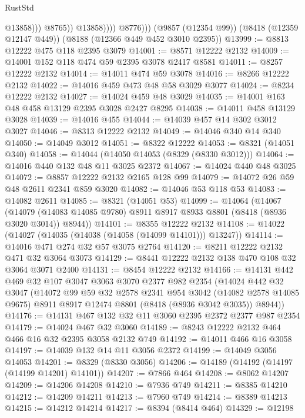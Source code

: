 \begin{lexlean}{RustStd}
\begin{coremodule}
                            @13858)))
                      @8765))
                  @13858))))
          @8776)))
    (@9857 (@12354 @99))
    (@8418 (@12359 @12147 @449))
    (@8188 (@12366 @449 @452 @3010 @2395))
@13999 := @8813 @12222 @475 @118 @2395 @3079
@14001 := @8571 @12222 @2132
@14009 := @14001 @152 @118 @474 @59 @2395 @3078 @2417 @8581
@14011 := @8257 @12222 @2132
@14014 := @14011 @474 @59 @3078
@14016 := @8266 @12222 @2132
@14022 := @14016 @459 @473 @48 @58 @3029 @3077
@14024 := @8234 @12222 @2132
@14027 := @14024 @459 @48 @3029
@14035 := @14001 @163 @48 @458 @13129 @2395 @3028 @2427 @8295
@14038 := @14011 @458 @13129 @3028
@14039 := @14016 @455
@14044 := @14039 @457 @14 @302 @3012 @3027
@14046 := @8313 @12222 @2132
@14049 := @14046 @340 @14 @340
@14050 := @14049 @3012
@14051 := @8322 @12222
@14053 := @8321 (@14051 @340)
@14058 := @14044 (@14050 @14053 (@8329 (@8330 @3012)))
@14064 := @14016 @440 @132 @48 @11 @3025 @2372
@14067 := @14024 @440 @48 @3025
@14072 := @8857 @12222 @2132 @2165 @128 @99
@14079 := @14072 @26 @59 @48 @2611 @2341 @859 @3020
@14082 := @14046 @53 @118 @53
@14083 := @14082 @2611
@14085 := @8321 (@14051 @53)
@14099 := @14064
    (@14067
      (@14079 (@14083 @14085 @9780) @8911 @8917 @8933 @8801 (@8418 (@8936 @3020 @3014)) @8944))
@14101 := @8355 @12222 @2132
@14108 := @14022 (@14027 (@14035 (@14038 (@14058 (@14099 @14101))) @13247))
@14114 := @14016 @471 @274 @32 @57 @3075 @2764
@14120 := @8211 @12222 @2132 @471 @32 @3064 @3073
@14129 := @8441 @12222 @2132 @138 @470 @108 @32 @3064 @3071 @2400
@14131 := @8454 @12222 @2132
@14166 := @14131
    @442
    @469
    @32
    @107
    @3047
    @3063
    @3070
    @2377
    @982
    @2354
    (@14024
      @442
      @32
      @3047
      (@14072
        @99
        @59
        @32
        @2578
        @2341
        @954
        @3042
        (@14082 @2578 @14085 @9675)
        @8911
        @8917
        @12474
        @8801
        (@8418 (@8936 @3042 @3035))
        @8944))
@14176 := @14131 @467 @132 @32 @11 @3060 @2395 @2372 @2377 @987 @2354
@14179 := @14024 @467 @32 @3060
@14189 := @8243 @12222 @2132 @464 @466 @16 @32 @2395 @3058 @2132 @749
@14192 := @14011 @466 @16 @3058
@14197 := @14039 @132 @14 @11 @3056 @2372
@14199 := @14049 @3056 @14053
@14201 := @8329 (@8330 @3056)
@14206 := @14189 (@14192 (@14197 (@14199 @14201) @14101))
@14207 := @7866 @464
@14208 := @8062 @14207
@14209 := @14206 @14208
@14210 := @7936 @749
@14211 := @8385 @14210
@14212 := @14209 @14211
@14213 := @7960 @749
@14214 := @8389 @14213
@14215 := @14212 @14214
@14217 := @8394 (@8414 @464)
@14329 := @12198

\end{coremodule}
\end{lexlean}
